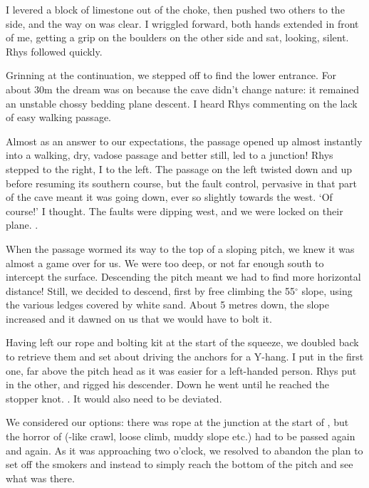 I levered a block of limestone out of the choke, then pushed two others to the side, and the way on was clear. I wriggled forward, both hands extended in front of me, getting a grip on the boulders on the other side and sat, looking, silent. Rhys followed quickly.

Grinning at the continuation, we stepped off to find the lower entrance. For about 30m the dream was on because the cave didn't change nature: it remained an unstable chossy bedding plane descent. I heard Rhys commenting on the lack of easy walking passage.

Almost as an answer to our expectations, the passage opened up almost instantly into a walking, dry, vadose passage and better still, led to a junction! Rhys stepped to the right, I to the left. The passage on the left twisted down and up before resuming its southern course, but the fault control, pervasive in that part of the cave meant it was going down, ever so slightly towards the west. `Of course!' I thought. The faults were dipping west, and we were locked on their plane. .

When the passage wormed its way to the top of a sloping pitch, we knew it was almost a game over for us. We were too deep, or not far enough south to intercept the surface. Descending the pitch meant we had to find more horizontal distance! Still, we decided to descend, first by free climbing the 55$^{\circ}$  slope, using the various ledges covered by white sand. About 5 metres down, the slope increased and it dawned on us that we would have to bolt it.

Having left our rope and bolting kit at the start of the squeeze, we doubled back to retrieve them and set about driving the anchors for a Y-hang. I put in the first one, far above the pitch head as it was easier for a left-handed person. Rhys put in the other, and rigged his descender. Down he went until he reached the stopper knot. . It would also need to be deviated.

We considered our options: there was rope at the junction at the start of , but the horror of  (-like crawl, loose climb, muddy slope etc.) had to be passed again and again. As it was approaching two o'clock, we resolved to abandon the plan to set off the smokers and instead to simply reach the bottom of the pitch and see what was there.

